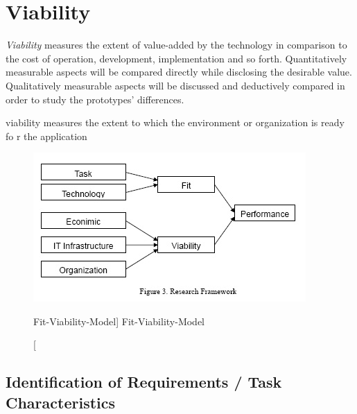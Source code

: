 \section{Viability}

\textit{Viability} measures the extent of value-added by the technology in comparison to the cost of operation, development, implementation and so forth. Quantitatively measurable aspects will be compared directly while disclosing the desirable value. Qualitatively measurable aspects will be discussed and deductively compared in order to study the prototypes' differences. 

viability  measures the extent to which the environment or organization is ready fo r the application



\begin{figure}[ht]
    \includegraphics[width=0.7\linewidth]{images/methodology/fvm.jpg}\centering
    \caption
    [Fit-Viability-Model]
    {Fit-Viability-Model \cite{Liang2007AdoptionModel}}
\end{figure}


\subsection{Identification of Requirements / Task Characteristics}

